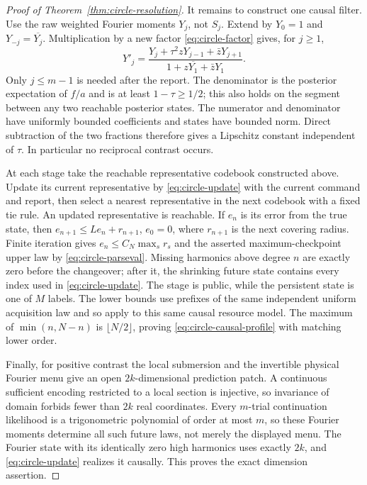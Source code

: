 \documentclass[11pt]{amsart}
\theoremstyle{definition}\newtheorem{definition}[theorem]{Definition}
\theoremstyle{remark}\newtheorem{remark}[theorem]{Remark}
\begin{document}
\begin{proof}[Proof of Theorem~\ref{thm:circle-resolution}]
It remains to construct one causal filter. Use the raw weighted Fourier
moments $Y_j$, not $S_j$. Extend by $Y_0=1$ and
$Y_{-j}=\overline{Y_j}$. Multiplication by a new factor
\eqref{eq:circle-factor} gives, for $j\ge1$,
\begin{equation}\label{eq:circle-update}
 Y'_j=\frac{Y_j+\tau^2zY_{j-1}+\bar zY_{j+1}}
                 {1+z\overline{Y_1}+\bar zY_1}.
\end{equation}
Only $j\le m-1$ is needed after the report. The denominator is the
posterior expectation of $f/a$ and is at least $1-\tau\ge1/2$;
this also holds on the segment between any two reachable posterior
states. The numerator and denominator have uniformly bounded coefficients
and states have bounded norm. Direct subtraction of the two fractions
therefore gives a Lipschitz constant independent of $\tau$. In
particular no reciprocal contrast occurs.

At each stage take the reachable representative codebook constructed
above. Update its current representative by \eqref{eq:circle-update}
with the current command and report, then select a nearest representative
in the next codebook with a fixed tie rule. An updated representative is
reachable. If $e_n$ is its error from the true state, then
$e_{n+1}\le L e_n+r_{n+1}$, $e_0=0$, where $r_{n+1}$ is the
next covering radius. Finite iteration gives
$e_n\le C_N\max_s r_s$ and the asserted maximum-checkpoint upper
law by \eqref{eq:circle-parseval}. Missing harmonics above degree $n$
are exactly zero before the changeover; after it, the shrinking future
state contains every index used in \eqref{eq:circle-update}.
The stage is public, while the persistent state is one of $M$ labels.
The lower bounds use prefixes of the same independent uniform acquisition
law and so apply to this same causal resource model. The maximum of
$\min(n,N-n)$ is $\lfloor N/2\rfloor$, proving
\eqref{eq:circle-causal-profile} with matching lower order.

Finally, for positive contrast the local submersion and the invertible
physical Fourier menu give an open $2k$-dimensional prediction patch.
A continuous sufficient encoding restricted to a local section is
injective, so invariance of domain forbids fewer than $2k$ real
coordinates. Every $m$-trial continuation likelihood is a trigonometric polynomial
of order at most $m$, so these Fourier moments determine all such future
laws, not merely the displayed menu. The Fourier state with its identically
zero high harmonics uses exactly $2k$, and \eqref{eq:circle-update} realizes it causally.
This proves the exact dimension assertion.
\end{proof}
\end{document}
